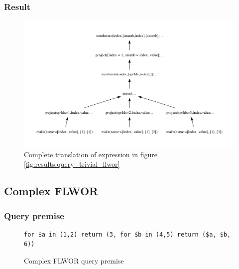 \subsubsection{Result}
\begin{figure}[!htp]
\begin{center}
  \includegraphics[width=1.0\textwidth]{img/graphs/td_impl_flwor_simple_xq_relalg} \caption{Complete translation of expression in figure
  \ref{fig:results:query_trivial_flwor}}
  \label{fig:results:query_trivial_flwor_result}
\end{center}
\end{figure}

\subsection{Complex FLWOR}
\label{sect:results:algebra:generated:complex_flwor}
\subsubsection{Query premise}
\begin{figure}[!htp]
\begin{center}
\begin{Verbatim}
for $a in (1,2) return (3, for $b in (4,5) return ($a, $b, 6))
\end{Verbatim}
  \caption{Complex FLWOR query premise}
  \label{fig:results:query_complex_flwor}
\end{center}
\end{figure}

